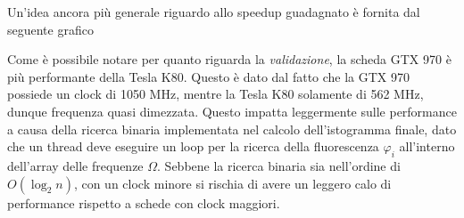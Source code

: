Un'idea ancora più generale riguardo allo speedup guadagnato è fornita dal
seguente grafico
\\
\begin{figure}[H]
    \begin{minipage}[b]{.5\linewidth}
        \centering
    \end{minipage}
    \begin{minipage}[b]{.5\linewidth}
        \centering
    \end{minipage}
    \caption{}
\end{figure}

Come è possibile notare per quanto riguarda la \textit{validazione}, la scheda
GTX 970 è più performante della Tesla K80. Questo è dato dal fatto che
la GTX 970 possiede un clock di 1050 MHz, mentre la Tesla K80 solamente di
562 MHz, dunque frequenza quasi dimezzata. Questo impatta leggermente sulle
performance a causa della ricerca binaria implementata nel calcolo
dell'istogramma finale, dato che un thread deve eseguire un loop per la ricerca
della fluorescenza $\varphi_{i}$ all'interno dell'array delle frequenze $\Omega$.
Sebbene la ricerca binaria sia nell'ordine di $O(\log_{2}{n})$, con un clock
minore si rischia di avere un leggero calo di performance rispetto a schede
con clock maggiori.
